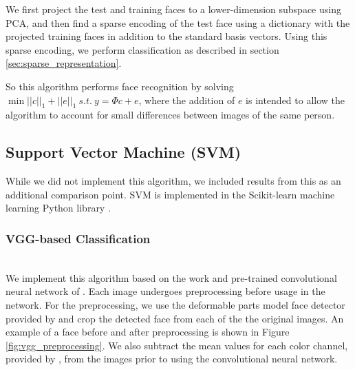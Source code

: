 \documentclass[pageno]{cos429}
\begin{document}
We first project the test and training faces to a lower-dimension subspace using PCA, and then find a sparse encoding of the test face using a dictionary with the projected training faces in addition to the standard basis vectors. Using this sparse encoding, we perform classification as described in section \ref{sec:sparse_representation}.

So this algorithm performs face recognition by solving $\min||c||_1+||e||_1\:s.t.\:y=\Phi c+e$, where the addition of $e$ is intended to allow the algorithm to account for small differences between images of the same person.

\subsection{Support Vector Machine (SVM)}
While we did not implement this algorithm, we included results from this as an additional comparison point. SVM is implemented in the Scikit-learn machine learning Python library \cite{scikit-learn}.

\subsubsection{VGG-based Classification}\hspace*{\fill} \\
We implement this algorithm based on the work and pre-trained convolutional neural network of \cite{parkhi_deep_2015}. Each image undergoes preprocessing before usage in the network. For the preprocessing, we use the deformable parts model face detector provided by \cite{parkhi_deep_2015} and crop the detected face from each of the the original images. An example of a face before and after preprocessing is shown in Figure \ref{fig:vgg_preprocessing}. We also subtract the mean values for each color channel, provided by \cite{parkhi_deep_2015}, from the images prior to using the convolutional neural network.
\end{document}
